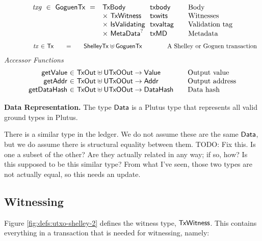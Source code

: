 \begin{figure*}[htb]
\begin{equation*}
\begin{array}{r@{~~}l@{~~}l@{\qquad}l}
      \var{txg} ~\in~ \GoguenTx ~=~
      & \TxBody & \fun{txbody} & \text{Body}\\
      & \times ~\TxWitness & \fun{txwits} & \text{Witnesses}\\
      & \times ~\IsValidating & \fun{txvaltag}&\text{Validation tag}\\
      & \times ~\MetaData^? & \fun{txMD}&\text{Metadata}\\
    \end{array}
  \end{equation*}
  \begin{equation*}
    \begin{array}{r@{~\in~}l@{\qquad=\qquad}l@{\qquad\qquad}l}
\qquad\qquad      \var{tx} & \Tx & \ShelleyTx \uniondistinct \GoguenTx &
      \text{A Shelley or Goguen transaction}\\
    \end{array}
  \end{equation*}
  \emph{Accessor Functions}
  \begin{equation*}
    \begin{array}{r@{~\in~}l@{\qquad}l}
      \fun{getValue} & \TxOut \uniondistinct \UTxOOut \to \Value & \text{Output value} \\
      \fun{getAddr} & \TxOut \uniondistinct \UTxOOut \to \Addr & \text{Output address} \\
      \fun{getDataHash} & \TxOut \uniondistinct \UTxOOut \to \DataHash & \text{Data hash}
    \end{array}
  \end{equation*}
  \caption{Definitions for transactions, cont.}
  \label{fig:defs:utxo-shelley-2}
\end{figure*}


\textbf{Data Representation.}
The type $\mathsf{Data}$ is a Plutus type that represents all valid ground types in Plutus.
\begin{note}
There is a similar type in the
ledger. We do not assume these are the same $\mathsf{Data}$, but we do assume there
is structural equality between them. TODO: {Fix this.  Is one a subset of the other?  Are they actually related in any way; if so, how?}
  Is this supposed to be this similar type? From what I've seen, those
  two types are not actually equal, so this needs an update.
\end{note}

\subsection{Witnessing}
Figure \ref{fig:defs:utxo-shelley-2} defines the witness type, $\mathsf{TxWitness}$.  This contains everything
in a transaction that is needed for witnessing, namely:

